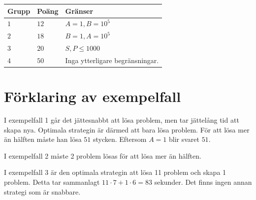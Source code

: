 \noindent
\begin{tabular}{| l | l | p{12cm} |}
  \hline
  \textbf{Grupp} & \textbf{Poäng} & \textbf{Gränser} \\ \hline
  $1$    & $12$       & $A=1, B=10^5$ \\ \hline
  $2$    & $18$       & $B=1, A=10^5$ \\ \hline
  $3$    & $20$       & $S, P \leq 1000$ \\ \hline
  $4$    & $50$       & Inga ytterligare begränsningar. \\ \hline
\end{tabular}

\section*{Förklaring av exempelfall}
I exempelfall 1 går det jättesnabbt att lösa problem, men tar jättelång tid att skapa nya. Optimala strategin
är därmed att bara lösa problem. För att lösa mer än hälften måste han lösa $51$ stycken. Eftersom $A=1$ blir svaret
$51$.

I exempelfall 2 måste 2 problem lösas för att lösa mer än hälften.

I exempelfall 3 är den optimala strategin att lösa 11 problem och skapa 1 problem. Detta tar sammanlagt
$11 \cdot 7 + 1 \cdot 6=83$ sekunder. Det finns ingen annan strategi som är snabbare.
